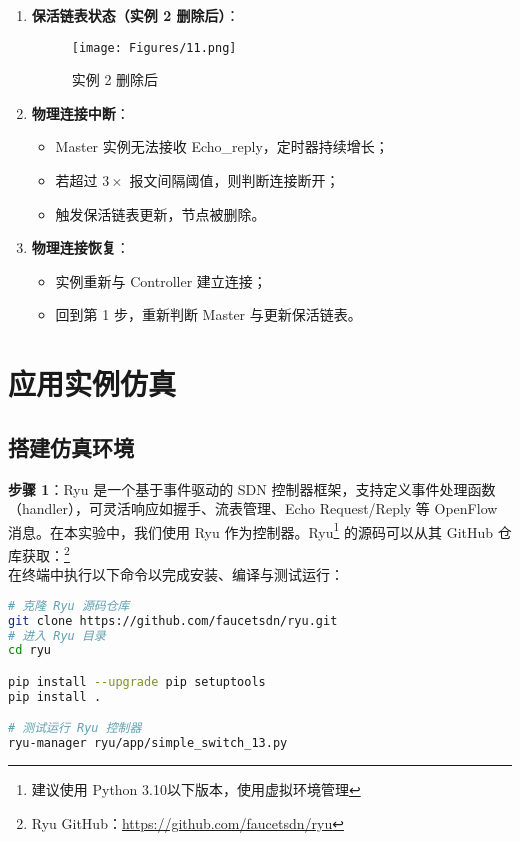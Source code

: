 \documentclass{article}
\begin{document}
\begin{enumerate}
    \item \textbf{保活链表状态（实例 2 删除后）}：
    
    
    \begin{figure}[h]
    \centering
    \texttt{[image: Figures/11.png]}
    \caption{实例 2 删除后}
    \end{figure}
    
    \item \textbf{物理连接中断}：
    \begin{itemize}
        \item Master 实例无法接收 Echo\_reply，定时器持续增长；
        \item 若超过 $3 \times$ 报文间隔阈值，则判断连接断开；
        \item 触发保活链表更新，节点被删除。
    \end{itemize}

    \item \textbf{物理连接恢复}：
    \begin{itemize}
        \item 实例重新与 Controller 建立连接；
        \item 回到第 1 步，重新判断 Master 与更新保活链表。
    \end{itemize}
\end{enumerate}



\section{应用实例仿真}

\subsection{\textbf{搭建仿真环境}}

\textbf{步骤 1}：Ryu \cite{ryu}是一个基于事件驱动的 SDN 控制器框架，支持定义事件处理函数（handler），可灵活响应如握手、流表管理、Echo Request/Reply 等 OpenFlow 消息。在本实验中，我们使用 Ryu 作为控制器。Ryu\footnote{建议使用 Python 3.10以下版本，使用虚拟环境管理} 的源码可以从其 GitHub 仓库获取：\footnote{Ryu GitHub：\url{https://github.com/faucetsdn/ryu}}\\
在终端中执行以下命令以完成安装、编译与测试运行：
\begin{lstlisting}[language=bash, caption={Ryu 控制器安装与测试}]
# 克隆 Ryu 源码仓库
git clone https://github.com/faucetsdn/ryu.git
# 进入 Ryu 目录
cd ryu

pip install --upgrade pip setuptools
pip install .

# 测试运行 Ryu 控制器
ryu-manager ryu/app/simple_switch_13.py
\end{lstlisting}
\end{document}
